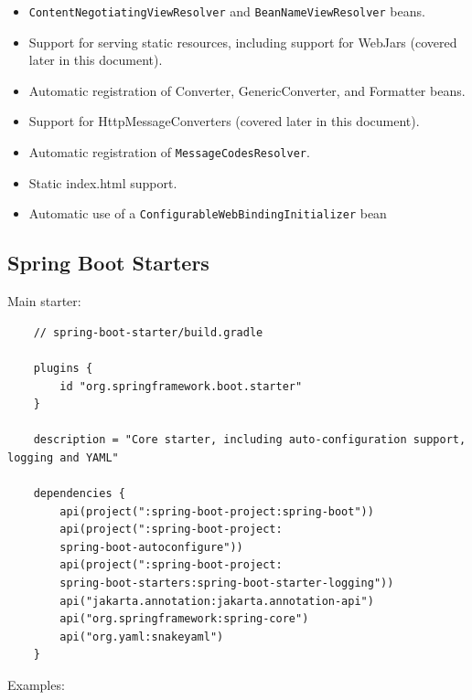 \documentclass{scrartcl}
\begin{document}
\begin{itemize}
    \item \lstinline|ContentNegotiatingViewResolver| and \lstinline|BeanNameViewResolver| beans.
    \item Support for serving static resources, including support for WebJars (covered later in this document).
    \item Automatic registration of Converter, GenericConverter, and Formatter beans.
    \item Support for HttpMessageConverters (covered later in this document).
    \item Automatic registration of \lstinline|MessageCodesResolver|.
    \item Static index.html support.
    \item Automatic use of a \lstinline|ConfigurableWebBindingInitializer| bean
\end{itemize}

\subsection{Spring Boot Starters}

Main starter:

\begin{lstlisting}
    // spring-boot-starter/build.gradle

    plugins {
        id "org.springframework.boot.starter"
    }

    description = "Core starter, including auto-configuration support, logging and YAML"

    dependencies {
        api(project(":spring-boot-project:spring-boot"))
        api(project(":spring-boot-project:
        spring-boot-autoconfigure"))
        api(project(":spring-boot-project:
        spring-boot-starters:spring-boot-starter-logging"))
        api("jakarta.annotation:jakarta.annotation-api")
        api("org.springframework:spring-core")
        api("org.yaml:snakeyaml")
    }
\end{lstlisting}

Examples:
\end{document}
